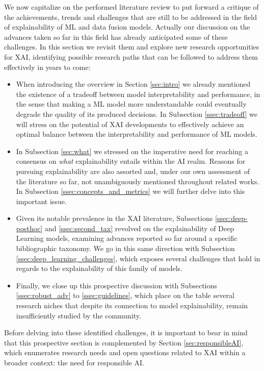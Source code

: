 \documentclass[final]{elsarticle}
\begin{document}
We now capitalize on the performed literature review to put forward a critique of the achievements, trends and challenges that are still to be addressed in the field of explainability of ML and data fusion models. Actually our discussion on the advances taken so far in this field has already anticipated some of these challenges. In this section we revisit them and explore new research opportunities for XAI, identifying possible research paths that can be followed to address them effectively in years to come:
\begin{itemize}[leftmargin=*]
    \item When introducing the overview in Section \ref{sec:intro} we already mentioned the existence of a tradeoff between model interpretability and performance, in the sense that making a ML model more understandable could eventually degrade the quality of its produced decisions. In Subsection \ref{ssec:tradeoff} we will stress on the potential of XAI developments to effectively achieve an optimal balance between the interpretability and performance of ML models.
    \item In Subsection \ref{sec:what} we stressed on the imperative need for reaching a consensus on \emph{what} explainability entails within the AI realm. Reasons for pursuing explainability are also assorted and, under our own assessment of the literature so far, not unambiguously mentioned throughout related works. In Subsection \ref{ssec:concepts_and_metrics} we will further delve into this important issue.
    \item Given its notable prevalence in the XAI literature, Subsections \ref{ssec:deep-posthoc} and \ref{ssec:second_tax} revolved on the explainability of Deep Learning models, examining advances reported so far around a specific bibliographic taxonomy. We go in this same direction with Subsection \ref{ssec:deep_learning_challenges}, which exposes several challenges that hold in regards to the explainability of this family of models.
    \item Finally, we close up this prospective discussion with Subsections \ref{ssec:robust_adv} to \ref{ssec:guidelines}, which place on the table several research niches that despite its connection to model explainability, remain insufficiently studied by the community. 
\end{itemize}

{\color{black}Before delving into these identified challenges, it is important to bear in mind that this prospective section is complemented by Section \ref{sec:responsibleAI}, which enumerates research needs and open questions related to XAI within a broader context: the need for responsible AI.}
\end{document}
